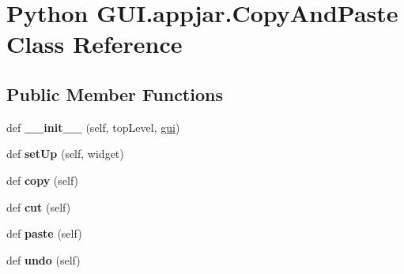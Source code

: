 \hypertarget{class_python_01_g_u_i_1_1appjar_1_1_copy_and_paste}{}\section{Python G\+U\+I.\+appjar.\+Copy\+And\+Paste Class Reference}
\label{class_python_01_g_u_i_1_1appjar_1_1_copy_and_paste}
\subsection*{Public Member Functions}
\begin{DoxyCompactItemize}
\item 
\mbox{\label{class_python_01_g_u_i_1_1appjar_1_1_copy_and_paste_a44cdd70647a94e5ce1a0ac86e22edbd7}} 
def {\bfseries \+\_\+\+\_\+init\+\_\+\+\_\+} (self, top\+Level, \hyperlink{class_python_01_g_u_i_1_1appjar_1_1gui}{gui})
\item 
\mbox{\label{class_python_01_g_u_i_1_1appjar_1_1_copy_and_paste_a5a7db1b0cd5cd6cfd17352bef7a0182e}} 
def {\bfseries set\+Up} (self, widget)
\item 
\mbox{\label{class_python_01_g_u_i_1_1appjar_1_1_copy_and_paste_a46c36cf6f3527605c2cb32f00760ff1f}} 
def {\bfseries copy} (self)
\item 
\mbox{\label{class_python_01_g_u_i_1_1appjar_1_1_copy_and_paste_a8fe6594007dc5aeeb740a16d9b9412a7}} 
def {\bfseries cut} (self)
\item 
\mbox{\label{class_python_01_g_u_i_1_1appjar_1_1_copy_and_paste_af72d0cf95478237c6ca40d42fba5940b}} 
def {\bfseries paste} (self)
\item 
\mbox{\label{class_python_01_g_u_i_1_1appjar_1_1_copy_and_paste_a7cc220764551dbfa5e43739912ed08c9}} 
def {\bfseries undo} (self)
\item 
\mbox{\label{class_python_01_g_u_i_1_1appjar_1_1_copy_and_paste_a2377d8d0138a13958e56f2897be43aa3}} 

\end{DoxyCompactItemize}
